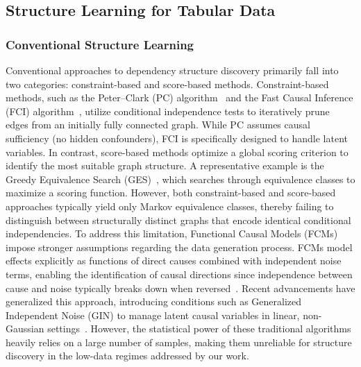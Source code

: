 \subsection{Structure Learning for Tabular Data}

\subsubsection{Conventional Structure Learning}
Conventional approaches to dependency structure discovery primarily fall into two categories: constraint-based and score-based methods. Constraint-based methods, such as the Peter--Clark (PC) algorithm~\cite{spirtes2000causation} and the Fast Causal Inference (FCI) algorithm~\cite{spirtes1995causal}, utilize conditional independence tests to iteratively prune edges from an initially fully connected graph. While PC assumes causal sufficiency (no hidden confounders), FCI is specifically designed to handle latent variables. In contrast, score-based methods optimize a global scoring criterion to identify the most suitable graph structure. A representative example is the Greedy Equivalence Search (GES)~\cite{chickering2002optimal}, which searches through equivalence classes to maximize a scoring function. However, both constraint-based and score-based approaches typically yield only Markov equivalence classes, thereby failing to distinguish between structurally distinct graphs that encode identical conditional independencies. To address this limitation, Functional Causal Models (FCMs) impose stronger assumptions regarding the data generation process. FCMs model effects explicitly as functions of direct causes combined with independent noise terms, enabling the identification of causal directions since independence between cause and noise typically breaks down when reversed~\cite{shimizu2006linear, hoyer2008nonlinear, zhang2009identifiability}. Recent advancements have generalized this approach, introducing conditions such as Generalized Independent Noise (GIN) to manage latent causal variables in linear, non-Gaussian settings~\cite{xie2020generalized}. However, the statistical power of these traditional algorithms heavily relies on a large number of samples, making them unreliable for structure discovery in the low-data regimes addressed by our work.

